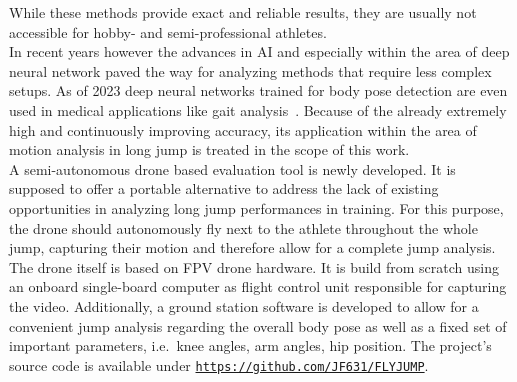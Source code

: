 \noindent While these methods provide exact and reliable results, they are 
usually not accessible for hobby- and semi-professional athletes.\\
In recent years however the advances in \ac{AI} and especially within the area 
of deep neural network paved the way for analyzing methods that require less 
complex setups.
As of 2023 deep neural networks trained for body pose detection are even used 
in medical applications like gait analysis~\cite{mp_gait_analysis}.
Because of the already extremely high and continuously improving accuracy, 
its application within the area of motion analysis in long jump is treated in 
the scope of this work.\\
A semi-autonomous drone based evaluation tool is newly developed.
It is supposed to offer a portable alternative to address the lack of existing
opportunities in analyzing long jump performances in training.
For this purpose, the drone should autonomously fly next to the athlete 
throughout the whole jump, capturing their motion and therefore allow for a 
complete jump analysis.
The drone itself is based on \ac{FPV} drone hardware.
It is build from scratch using an onboard single-board computer as flight 
control unit responsible for capturing the video.
Additionally, a ground station software is developed to allow for a convenient
jump analysis regarding the overall body pose as well as a fixed set of 
important parameters, i.e.~knee angles, arm angles, hip position. 
The project's source code is available under \texttt{\url{https://github.com/JF631/FLYJUMP}}.
